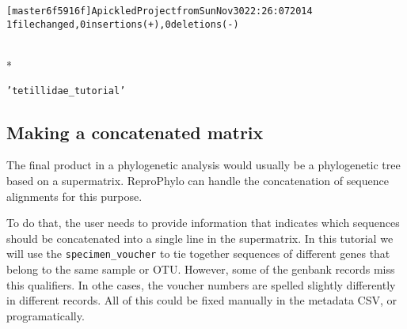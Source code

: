 \documentclass[letterpaper,10pt,english]{/usr/share/sphinx/texinputs/sphinxhowto}
\def\smaller{\fontsize{9.5pt}{9.5pt}\selectfont}
\newenvironment{InvisibleVerbatim}
        {\begin{mdframed}[leftmargin=0.1\linewidth,innerleftmargin=3pt,innerrightmargin=3pt, userdefinedwidth=1\linewidth, linewidth=0pt, linecolor=white, usetwoside=false]}
        {\end{mdframed}}
\begin{document}
    

        
        

            
                \begin{InvisibleVerbatim}
                \vspace{-0.5\baselineskip}
\begin{alltt}
[master 6f5916f] A pickled Project from Sun Nov 30 22:26:07 2014
 1 file changed, 0 insertions(+), 0 deletions(-)

\end{alltt}

            \end{InvisibleVerbatim}
            
                \makebox[0.1\linewidth]{\smaller\hfill\tt\color{nbframe-out-prompt}Out\hspace{4pt}{[}31{]}:\hspace{4pt}}\\*
                \vspace{-2.55\baselineskip}\begin{InvisibleVerbatim}
                \vspace{-0.5\baselineskip}
\begin{alltt}'tetillidae\_tutorial'\end{alltt}

            \end{InvisibleVerbatim}
            
        
    
\subsection{Making a concatenated
matrix}\label{making-a-concatenated-matrix}

The final product in a phylogenetic analysis would usually be a
phylogenetic tree based on a supermatrix. ReproPhylo can handle the
concatenation of sequence alignments for this purpose.

To do that, the user needs to provide information that indicates which
sequences should be concatenated into a single line in the supermatrix.
In this tutorial we will use the \texttt{specimen\_voucher} to tie
together sequences of different genes that belong to the same sample or
OTU. However, some of the genbank records miss this qualifiers. In othe
cases, the voucher numbers are spelled slightly differently in different
records. All of this could be fixed manually in the metadata CSV, or
programatically.
\end{document}
